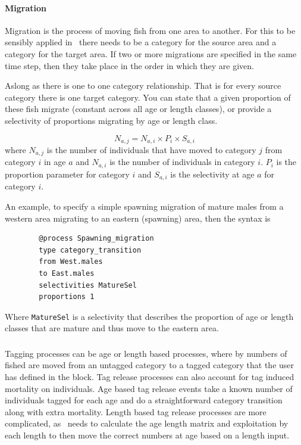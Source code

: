 \paragraph{Migration}
Migration is the process of moving fish from one area to another. For this to be sensibly applied in \CNAME\ there needs to be a category for the source area and a category for the target area. If two or more migrations are specified in the same time step, then they take place in the order in which they are given.

 Aslong as there is one to one category relationship. That is for every source category there is one target category. You can state that a given proportion of these fish migrate (constant across all age or length classes), or provide a selectivity of proportions migrating by age or length class.

\begin{equation}
	N_{a,j} = N_{a,i} \times P_i \times S_{a,i}
\end{equation}
where $N_{a,j}$ is the number of individuals that have moved to category $j$ from category $i$ in age $a$ and $N_{a,i}$ is the number of individuals in category $i$. $P_i$ is the proportion parameter for category $i$ and $S_{a,i}$ is the selectivity at age $a$ for category $i$.


An example, to specify a simple spawning migration of mature males from a western area migrating to an eastern (spawning) area, then the syntax is
{\small{\begin{verbatim}
		@process Spawning_migration
		type category_transition 
		from West.males	
		to East.males	
		selectivities MatureSel
		proportions 1
		\end{verbatim}}}

Where \texttt{MatureSel} is a selectivity that describes the proportion of age or length classes that are mature and thus move to the eastern area.


\subsubsection{}
Tagging processes can be age or length based processes, where by numbers of fished are moved from an untagged category to a tagged category that the user has defined in the  block. Tag release processes can also account for tag induced mortality on individuals. Age based tag release events take a known number of individuals tagged for each age and do a straightforward category transition along with extra mortality. Length based tag release processes are more complicated, as \CNAME\ needs to calculate the age length matrix and exploitation by each length to then move the correct numbers at age based on a length input. 


